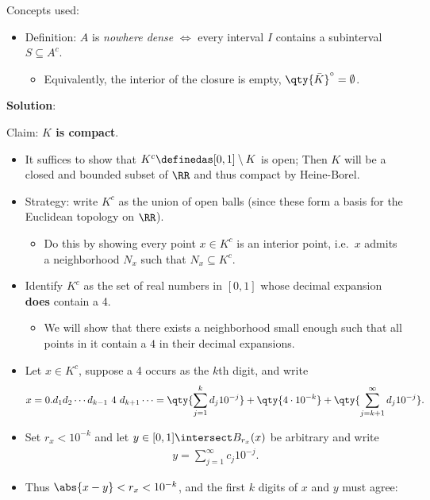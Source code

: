 \begin{solution}

Concepts used:

\begin{itemize}
\tightlist
\item
  Definition: \(A\) is \emph{nowhere dense} \(\iff\) every interval
  \(I\) contains a subinterval \(S \subseteq A^c\).

  \begin{itemize}
  \tightlist
  \item
    Equivalently, the interior of the closure is empty,
    \(\qty{\bar K}^\circ = \emptyset\).
  \end{itemize}
\end{itemize}

\textbf{Solution}:

Claim: \textbf{\(K\) is compact}.

\begin{itemize}
\item
  It suffices to show that \(K^c \definedas [0, 1]\setminus K\) is open;
  Then \(K\) will be a closed and bounded subset of \(\RR\) and thus
  compact by Heine-Borel.
\item
  Strategy: write \(K^c\) as the union of open balls (since these form a
  basis for the Euclidean topology on \(\RR\)).

  \begin{itemize}
  \tightlist
  \item
    Do this by showing every point \(x\in K^c\) is an interior point,
    i.e.~\(x\) admits a neighborhood \(N_x\) such that
    \(N_x \subseteq K^c\).
  \end{itemize}
\item
  Identify \(K^c\) as the set of real numbers in \([0, 1]\) whose
  decimal expansion \textbf{does} contain a 4.

  \begin{itemize}
  \tightlist
  \item
    We will show that there exists a neighborhood small enough such that
    all points in it contain a \(4\) in their decimal expansions.
  \end{itemize}
\item
  Let \(x\in K^c\), suppose a 4 occurs as the \(k\)th digit, and write
  \begin{align*}  
  x = 0.d_1 d_2 \cdots d_{k-1}~ 4 ~d_{k+1}\cdots 
  = \qty{\sum_{j=1}^k d_j 10^{-j}} + \qty{4\cdot 10^{-k}} + \qty{\sum_{j=k+1}^\infty d_j 10^{-j}}
  .\end{align*}
\item
  Set \(r_x < 10^{-k}\) and let \(y \in [0, 1] \intersect B_{r_x}(x)\)
  be arbitrary and write
  \begin{align*}  
  y = \sum_{j=1}^\infty c_j 10^{-j}
  .\end{align*}
\item
  Thus \(\abs{x-y} < r_x < 10^{-k}\), and the first \(k\) digits of
  \(x\) and \(y\) must agree:


\end{itemize}
\end{solution}
